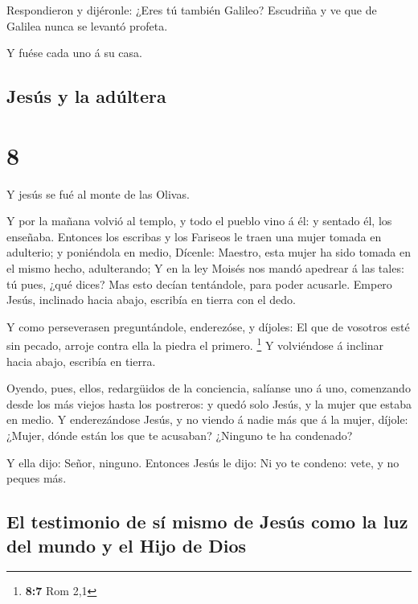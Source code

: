  Respondieron y dijéronle: ¿Eres tú también Galileo?
Escudriña y ve que de Galilea nunca se levantó profeta.

 Y fuése cada uno á su casa.

\hypertarget{jesuxfas-y-la-aduxfaltera}{%
\subsection{Jesús y la adúltera}\label{jesuxfas-y-la-aduxfaltera}}

\hypertarget{section-7}{%
\section{8}\label{section-7}}

 Y jesús se fué al monte de las Olivas.

 Y por la mañana volvió al templo, y todo el pueblo vino á
él: y sentado él, los enseñaba.  Entonces los escribas y los
Fariseos le traen una mujer tomada en adulterio; y poniéndola en medio,
 Dícenle: Maestro, esta mujer ha sido tomada en el mismo
hecho, adulterando;  Y en la ley Moisés nos mandó apedrear á
las tales: tú pues, ¿qué dices?  Mas esto decían tentándole,
para poder acusarle. Empero Jesús, inclinado hacia abajo, escribía en
tierra con el dedo.

 Y como perseverasen preguntándole, enderezóse, y díjoles:
El que de vosotros esté sin pecado, arroje contra ella la piedra el
primero. \footnote{\textbf{8:7} Rom 2,1}  Y volviéndose á
inclinar hacia abajo, escribía en tierra.

 Oyendo, pues, ellos, redargüidos de la conciencia, salíanse
uno á uno, comenzando desde los más viejos hasta los postreros: y quedó
solo Jesús, y la mujer que estaba en medio.  Y
enderezándose Jesús, y no viendo á nadie más que á la mujer, díjole:
¿Mujer, dónde están los que te acusaban? ¿Ninguno te ha condenado?

 Y ella dijo: Señor, ninguno. Entonces Jesús le dijo: Ni yo
te condeno: vete, y no peques más.

\hypertarget{el-testimonio-de-suxed-mismo-de-jesuxfas-como-la-luz-del-mundo-y-el-hijo-de-dios}{%
\subsection{El testimonio de sí mismo de Jesús como la luz del mundo y
el Hijo de
Dios}\label{el-testimonio-de-suxed-mismo-de-jesuxfas-como-la-luz-del-mundo-y-el-hijo-de-dios}}

